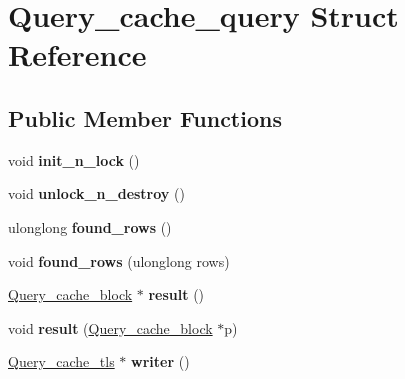 \hypertarget{structQuery__cache__query}{}\section{Query\+\_\+cache\+\_\+query Struct Reference}
\label{structQuery__cache__query}
\subsection*{Public Member Functions}
\begin{DoxyCompactItemize}
\item 
\mbox{\label{structQuery__cache__query_a4ad6d87c7cdafa3afd34e11b775eefb9}} 
void {\bfseries init\+\_\+n\+\_\+lock} ()
\item 
\mbox{\label{structQuery__cache__query_a112b720472878b4b29585006f0d9dfd0}} 
void {\bfseries unlock\+\_\+n\+\_\+destroy} ()
\item 
\mbox{\label{structQuery__cache__query_ae26f4e7e4b8192ddb9fd1b0f26624229}} 
ulonglong {\bfseries found\+\_\+rows} ()
\item 
\mbox{\label{structQuery__cache__query_af9336b5ca474229a1871c7c24989885d}} 
void {\bfseries found\+\_\+rows} (ulonglong rows)
\item 
\mbox{\label{structQuery__cache__query_a09590d1a88abbc28e02cec6c3871271a}} 
\mbox{\hyperlink{structQuery__cache__block}{Query\+\_\+cache\+\_\+block}} $\ast$ {\bfseries result} ()
\item 
\mbox{\label{structQuery__cache__query_a77853cadd608312d5772d27aa1dc5fcb}} 
void {\bfseries result} (\mbox{\hyperlink{structQuery__cache__block}{Query\+\_\+cache\+\_\+block}} $\ast$p)
\item 
\mbox{\label{structQuery__cache__query_aecb40a6ebbf4653a1b13acb9c5955784}} 
\mbox{\hyperlink{structQuery__cache__tls}{Query\+\_\+cache\+\_\+tls}} $\ast$ {\bfseries writer} ()
\item 
\mbox{\label{structQuery__cache__query_acf875ed3bf69e78c245d674b0c8c40bd}} 

\end{DoxyCompactItemize}
